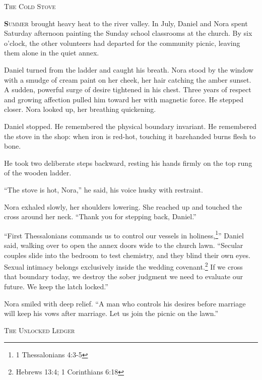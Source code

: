 \documentclass[11pt]{article}
\begin{document}
\newpage

\begin{center}
    {\scshape\large The Cold Stove}\par
    \vspace{0.2in}
\end{center}

\lettrine[lines=3,findent=3pt,nindent=0pt]{\textbf{S}}{ummer} brought heavy heat to the river valley. In July, Daniel and Nora spent Saturday afternoon painting the Sunday school classrooms at the church. By six o'clock, the other volunteers had departed for the community picnic, leaving them alone in the quiet annex.

Daniel turned from the ladder and caught his breath. Nora stood by the window with a smudge of cream paint on her cheek, her hair catching the amber sunset. A sudden, powerful surge of desire tightened in his chest. Three years of respect and growing affection pulled him toward her with magnetic force. He stepped closer. Nora looked up, her breathing quickening.

Daniel stopped. He remembered the physical boundary invariant. He remembered the stove in the shop: when iron is red-hot, touching it barehanded burns flesh to bone.

He took two deliberate steps backward, resting his hands firmly on the top rung of the wooden ladder.

``The stove is hot, Nora,'' he said, his voice husky with restraint.

Nora exhaled slowly, her shoulders lowering. She reached up and touched the cross around her neck. ``Thank you for stepping back, Daniel.''

``First Thessalonians commands us to control our vessels in holiness,\footnote{1 Thessalonians 4:3-5}'' Daniel said, walking over to open the annex doors wide to the church lawn. ``Secular couples slide into the bedroom to test chemistry, and they blind their own eyes. Sexual intimacy belongs exclusively inside the wedding covenant.\footnote{Hebrews 13:4; 1 Corinthians 6:18} If we cross that boundary today, we destroy the sober judgment we need to evaluate our future. We keep the latch locked.''

Nora smiled with deep relief. ``A man who controls his desires before marriage will keep his vows after marriage. Let us join the picnic on the lawn.''

\newpage

\begin{center}
    {\scshape\large The Unlocked Ledger}\par
    \vspace{0.2in}
\end{center}
\end{document}
